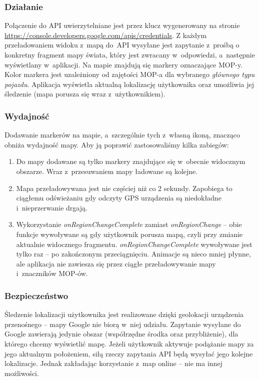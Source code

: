 \subsubsection{Działanie}
Połączenie do API uwierzytelniane jest przez klucz wygenerowany na stronie \url{https://console.developers.google.com/apis/credentials}. Z każdym przeładowaniem widoku z~mapą do~API wysyłane jest zapytanie z~prośbą o konkretny fragment mapy świata, który jest zwracany w~odpowiedzi, a~następnie wyświetlany w~aplikacji. Na mapie znajdują się markery oznaczające MOP-y. Kolor markera jest uzależniony od zajętości MOP-a dla wybranego \textit{głównego typu pojazdu}. Aplikacja wyświetla aktualną lokalizację użytkownika oraz umożliwia jej śledzenie (mapa porusza się wraz z~użytkownikiem). 
\subsubsection{Wydajność}
Dodawanie markerów na mapie, a~szczególnie tych z~własną ikoną, znacząco obniża wydajność mapy. Aby ją poprawić zastosowaliśmy kilka zabiegów:
\begin{enumerate}
\item Do mapy dodawane są tylko markery znajdujące się w~obecnie widocznym obszarze. Wraz z~przesuwaniem mapy ładowane są kolejne.
\item Mapa przeładowywana jest nie częściej niż co 2 sekundy. Zapobiega to ciągłemu odświeżaniu gdy odczyty GPS urządzenia są niedokładne i~nieprzerwanie drgają.
\item Wykorzystanie \textit{onRegionChangeComplete} zamiast \textit{onRegionChange} -- obie funkcje wywoływane są gdy użytkownik porusza mapą, czyli przy zmianie aktualnie widocznego fragmentu. \textit{onRegionChangeComplete} wywoływane jest tylko raz -- po zakończonym przeciągnięciu. Animacje są nieco mniej płynne, ale aplikacja nie zawiesza się przez ciągłe przeładowywanie mapy i~znaczników MOP-ów.
\end{enumerate}
\subsubsection{Bezpieczeństwo}
Śledzenie lokalizacji użytkownika jest realizowane dzięki geolokacji urządzenia przenośnego -- mapy Google nie biorą w~niej udziału. Zapytanie wysyłane do Google zawierają jedynie obszar (współrzędne środka oraz przybliżenie), dla którego chcemy wyświetlić mapę. Jeżeli użytkownik aktywuje podążanie mapy za jego aktualnym położeniem, siłą rzeczy zapytania API będą wysyłać jego kolejne lokalizacje. Jednak zakładając korzystanie z~map online -- nie ma innej możliwości. 

